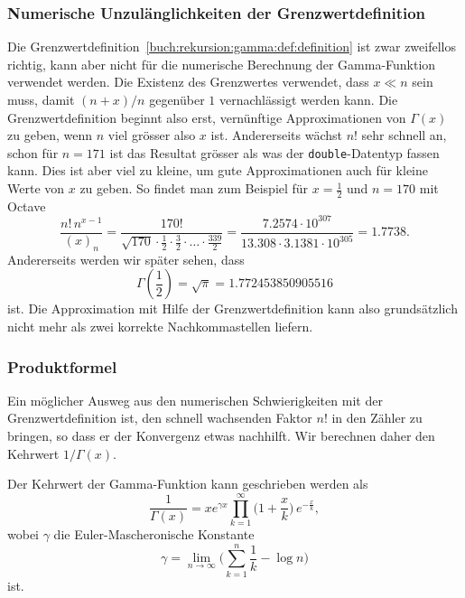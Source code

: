 \subsubsection{Numerische Unzulänglichkeiten der Grenzwertdefinition}
Die Grenzwertdefinition~\ref{buch:rekursion:gamma:def:definition}
ist zwar zweifellos richtig, kann aber nicht für die numerische 
Berechnung der Gamma-Funktion verwendet werden.
Die Existenz des Grenzwertes verwendet, dass $x\ll n$ sein muss,
damit $(n+x)/n$ gegenüber $1$ vernachlässigt werden kann.
Die Grenzwertdefinition beginnt also erst, vernünftige Approximationen
von $\Gamma(x)$ zu geben, wenn $n$ viel grösser also $x$ ist.
Andererseits wächst $n!$ sehr schnell an, schon für $n=171$ ist
das Resultat grösser als was der \texttt{double}-Datentyp fassen kann.
Dies ist aber viel zu kleine, um gute Approximationen auch für kleine
Werte von $x$ zu geben.
So findet man zum Beispiel für $x=\frac12$ und $n=170$ mit Octave
\[
\frac{n!\,n^{x-1}}{(x)_n}
=
\frac{170!}{\sqrt{170}\cdot \frac12\cdot\frac32\cdot\ldots\cdot\frac{339}{2}}
=
\frac{7.2574\cdot10^{307}}{13.308\cdot 3.1381\cdot10^{305}}
=
1.7738.
\]
Andererseits werden wir später sehen, dass 
\[
\Gamma({\textstyle\frac12})
=
\sqrt{\pi}
=
1.772453850905516
\]
ist.
Die Approximation mit Hilfe der Grenzwertdefinition kann also
grundsätzlich nicht mehr als zwei korrekte Nachkommastellen liefern.

\subsubsection{Produktformel}
Ein möglicher Ausweg aus den numerischen Schwierigkeiten mit der
Grenzwertdefinition ist, den schnell wachsenden Faktor $n!$
in den Zähler zu bringen, so dass er der Konvergenz etwas nachhilft.
Wir berechnen daher den Kehrwert $1/\Gamma(x)$.

\begin{satz}
\label{buch:rekursion:gamma:satz:produktformel}
Der Kehrwert der Gamma-Funktion kann geschrieben werden als
\begin{equation}
\frac{1}{\Gamma(x)}
=
xe^{\gamma x}
\prod_{k=1}^\infty
\biggl(1+\frac{x}k\biggr)\,e^{-\frac{x}{k}},
\label{buch:rekursion:gamma:eqn:produktformel}
\end{equation}
wobei $\gamma$ die Euler-Mascheronische Konstante
\[
\gamma
=
\lim_{n\to\infty}
\biggl(\sum_{k=1}^n\frac{1}{k}-\log n\biggr)
\]
ist.
\end{satz}

